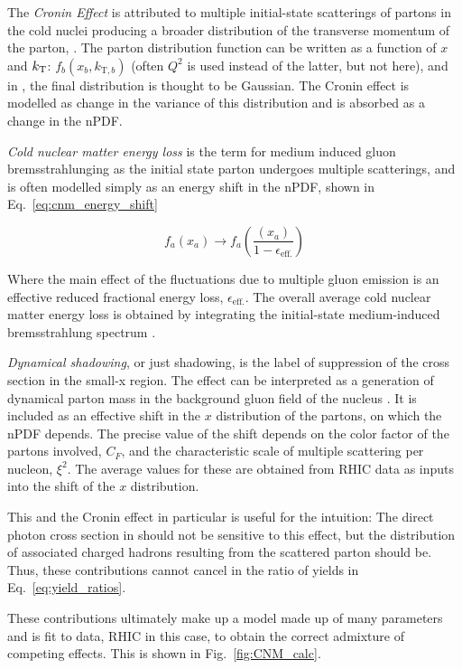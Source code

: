 The \textit{Cronin Effect} is attributed to multiple initial-state scatterings of partons in the cold nuclei producing a broader distribution of the transverse momentum of the parton, \kt. The parton distribution function can be written as a function of $x$ and  $k_\mathrm{T}$: $f_{b}(x_b,k_{\mathrm{T},b})$ (often $Q^2$ is used instead of the latter, but not here), and in \cite{Kang2012}, the final \kt distribution is thought to be Gaussian. The Cronin effect is modelled as change in the variance of this distribution and is absorbed as a change in the nPDF.

\textit{Cold nuclear matter energy loss} is the term for medium induced gluon bremsstrahlunging as the initial state parton undergoes multiple scatterings, and is often modelled simply as an energy shift in the nPDF, shown in Eq.~\ref{eq:cnm_energy_shift}

  \begin{equation}
    f_{a}(x_a) \rightarrow f_{a}(\frac{(x_a)}{1-\epsilon_\mathrm{eff.}}) 
    \label{eq:cnm_energy_shift}
  \end{equation}

  Where the main effect of the fluctuations due to multiple gluon emission is an effective reduced fractional energy loss, $\epsilon_\mathrm{eff.}$. The overall average cold nuclear matter energy loss is obtained by integrating the initial-state medium-induced bremsstrahlung spectrum \cite{Vitev2007}. 

  \textit{Dynamical shadowing}, or just shadowing, is the label of suppression of the cross section in the small-x region. The effect can be interpreted as a generation of dynamical parton mass in the background gluon field of the nucleus \cite{Qiu2004}. It is included as an effective shift in the $x$ distribution of the partons, on which the nPDF depends. The precise value of the shift depends on the color factor of the partons involved, $C_F$, and the characteristic scale of multiple scattering per nucleon, $\xi^2$. The average values for these are obtained from RHIC data as inputs into the shift of the $x$ distribution.

  This and the Cronin effect in particular is useful for the intuition: The direct photon cross section in \pPb should not be sensitive to this effect, but the distribution of associated charged hadrons resulting from the scattered parton should be. Thus, these contributions cannot cancel in the ratio of yields in Eq.~\ref{eq:yield_ratios}.

  These contributions ultimately make up a model made up of many parameters and is fit to data, RHIC in this case, to obtain the correct admixture of competing effects. This is shown in Fig.~\ref{fig:CNM_calc}. 

